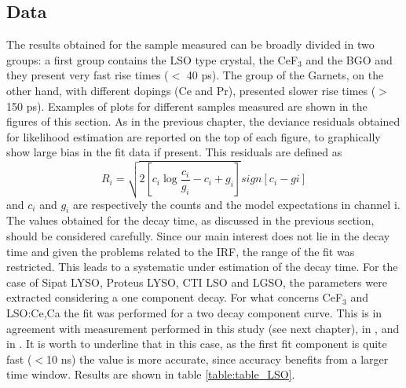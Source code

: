 \subsection{Data}
The results obtained for the sample measured can be broadly divided in two groups: a first group contains the LSO type crystal, the CeF$_{3}$ and the BGO and they present very fast rise times ($<$ 40 ps).
The group of the Garnets, on the other hand, with different dopings (Ce and Pr), presented slower rise times ($>$150 ps).
Examples of plots for different samples measured are shown in the figures of this section. As in the previous chapter, the deviance residuals obtained for likelihood estimation are reported on the top of each figure, to graphically show large bias in the fit data if present. This residuals are defined as
\begin{equation}
R_{i} = \sqrt{2\left[ c_{i}\log{\frac{c_{i}}{g_{i}}-c_{i}+g_{i}} \right]}sign\left[ c_{i}-g{i} \right]
\end{equation}
and $c_{i}$ and $g_{i}$ are respectively the counts and the model expectations in channel i.
The values obtained for the decay time, as discussed in the previous section, should be considered carefully. 
Since our main interest does not lie in the decay time and given the problems related to the IRF, the range of the fit was restricted. This leads to a systematic under estimation of the decay time.
For the case of Sipat LYSO, Proteus LYSO, CTI LSO and LGSO,  the parameters were extracted considering a one component decay. 
For what concerns CeF$_{3}$ and LSO:Ce,Ca the fit was performed for a two decay component curve. This is in agreement with measurement performed in this study (see next chapter), in \cite{Gundacker2014}, and in \cite{Lecoq2006}.
It is worth to underline that in this case, as the first fit component is quite fast ($<$10 ns) the value is more accurate, since accuracy benefits from a larger time window.
Results are shown in table \ref{table:table_LSO}.

